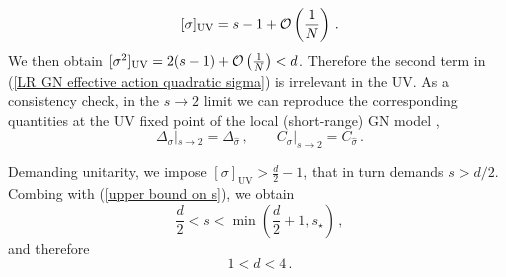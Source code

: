 \documentclass[aps,amsmath,amssymb,prd,showpacs,floatfix,preprint,superscriptaddress,nofootinbib,12pt]{article}
\begin{document}
\begin{equation}
\label{[sigma] UV}
[\sigma] _ {\textrm{UV}} = s-1+{\cal O}\left(\frac{1}{N}\right)\,.
\end{equation}
We then obtain $[\sigma^2]_{\textrm{UV}} = 2(s-1)+{\cal O}\left(\frac{1}{N}\right) < d$. Therefore the 
second term in (\ref{LR GN effective action quadratic sigma}) is irrelevant in the UV.
As a consistency check, in the $s\rightarrow 2$ limit we can reproduce the corresponding quantities at the UV
fixed point of the local (short-range) GN model \cite{Zinn-Justin:1991ksq,Manashov:2017rrx,Manashov:2016uam},
\begin{equation}
\Delta_\sigma|_{s\rightarrow 2} = \Delta_{\hat\sigma}\,,\qquad
C_\sigma|_{s\rightarrow 2} = C_{\hat\sigma}\,.
\end{equation}

Demanding unitarity, we impose $[\sigma]_{\textrm{UV}} > \frac{d}{2}-1$, that in turn
demands $s > d/2$. Combing with (\ref{upper bound on s}), we obtain
\begin{equation}
\label{bounds on s}
\frac{d}{2}< s < \min\left(\frac{d}{2}+1,s_\star\right)\,,
\end{equation}
and therefore
\begin{equation}
\label{bounds on d}
1 < d < 4\,.
\end{equation}
\end{document}
